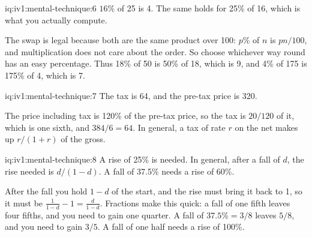 \begin{solution}{iq:iv1:mental-technique:6}
$16\%$ of 25 is 4. The same holds for 25\% of 16, which is what you actually compute.

The swap is legal because both are the same product over 100: $p\%$ of $n$ is $pn/100$, and multiplication does not care about the order. So choose whichever way round has an easy percentage. Thus 18\% of 50 is 50\% of 18, which is 9, and 4\% of 175 is 175\% of 4, which is 7.

\end{solution}

\begin{solution}{iq:iv1:mental-technique:7}
The tax is 64, and the pre-tax price is 320.

The price including tax is 120\% of the pre-tax price, so the tax is $20/120$ of it, which is one sixth, and $384 / 6 = 64$. In general, a tax of rate $r$ on the net makes up $r/(1 + r)$ of the gross.

\end{solution}

\begin{solution}{iq:iv1:mental-technique:8}
A rise of 25\% is needed. In general, after a fall of $d$, the rise needed is $d/(1 - d)$. A fall of 37.5\% needs a rise of 60\%.

After the fall you hold $1 - d$ of the start, and the rise must bring it back to 1, so it must be $\frac{1}{1 - d} - 1 = \frac{d}{1 - d}$. Fractions make this quick: a fall of one fifth leaves four fifths, and you need to gain one quarter. A fall of $37.5\% = 3/8$ leaves $5/8$, and you need to gain $3/5$. A fall of one half needs a rise of 100\%.

\end{solution}

